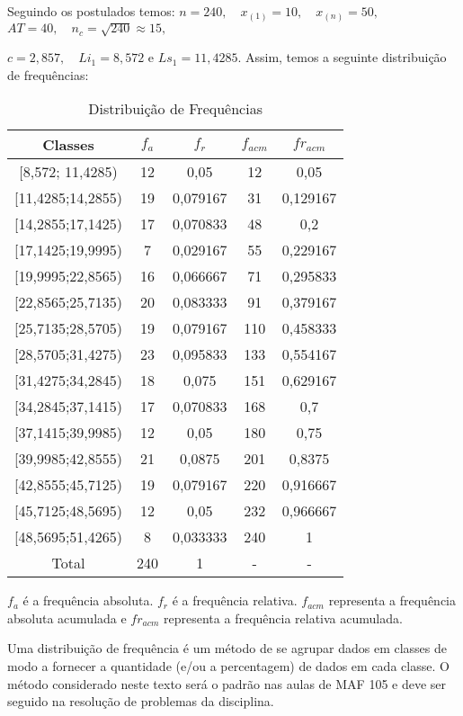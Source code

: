 \documentclass{article}
\begin{document}
Seguindo os postulados temos: $n=240,\quad x_{(1)}=10,\quad x_{(n)}=50,$ $AT=40,\quad 
n_{c}=\sqrt{240}\approx 15,$ 

$c=2,857,\quad Li_{1}=8,572$ e $Ls_{1}=11,4285.$ Assim, temos a seguinte distribuição de frequências:

\begin{table}[H]
  \centering
  \caption{Distribuição de Frequências}
    \begin{tabular}{|c|c|c|c|c|}
    \hline
    Classes & $f_{a}$    & $f_{r}$    & $f_{acm}$ & $fr_{acm}$ \\
    \hline
    [8,572;     11,4285) & 12    & 0,05  & 12    & 0,05 \\
    \hline
    [11,4285;14,2855) & 19    & 0,079167 & 31    & 0,129167 \\
    \hline
    [14,2855;17,1425) & 17    & 0,070833 & 48    & 0,2 \\
    \hline
    [17,1425;19,9995) & 7     & 0,029167 & 55    & 0,229167 \\
    \hline
    [19,9995;22,8565) & 16    & 0,066667 & 71    & 0,295833 \\
    \hline
    [22,8565;25,7135) & 20    & 0,083333 & 91    & 0,379167 \\
    \hline
    [25,7135;28,5705) & 19    & 0,079167 & 110   & 0,458333 \\
    \hline
    [28,5705;31,4275) & 23    & 0,095833 & 133   & 0,554167 \\
    \hline
    [31,4275;34,2845) & 18    & 0,075 & 151   & 0,629167 \\
    \hline
    [34,2845;37,1415) & 17    & 0,070833 & 168   & 0,7 \\
    \hline
    [37,1415;39,9985) & 12    & 0,05  & 180   & 0,75 \\
    \hline
    [39,9985;42,8555) & 21    & 0,0875 & 201   & 0,8375 \\
    \hline
    [42,8555;45,7125) & 19    & 0,079167 & 220   & 0,916667 \\
    \hline
    [45,7125;48,5695) & 12    & 0,05  & 232   & 0,966667 \\
    \hline
    [48,5695;51,4265) & 8     & 0,033333 & 240   & 1 \\
    \hline
    Total & 240   & 1     & -     & - \\
    \hline
    \end{tabular}%
  \label{tab:addlabel}%
\end{table}%

$f_{a}$ é a frequência absoluta. $f_{r}$ é a frequência relativa. $f_{acm}$ representa a frequência absoluta acumulada e $fr_{acm}$ representa a frequência relativa acumulada.

Uma distribuição de frequência é um método de se agrupar dados em classes de modo a fornecer a quantidade (e/ou a percentagem) de dados em cada classe. O método considerado neste texto será o padrão nas aulas de MAF 105 e deve ser seguido na resolução de problemas da disciplina.
\end{document}
